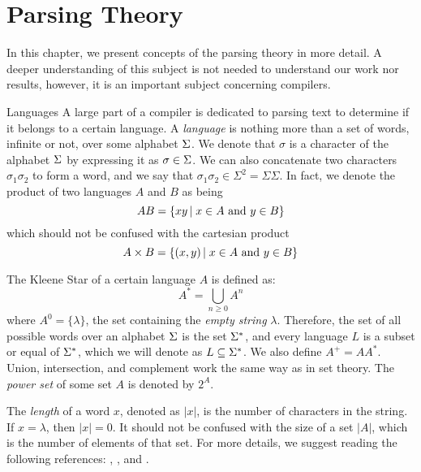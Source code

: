 \chapter{Parsing Theory}\label{sec:apendix-parser}

In this chapter, we present concepts of the parsing theory in more detail. A
deeper understanding of this subject is not needed to understand our work nor
results, however, it is an important subject concerning compilers.

\begin{section}{Languages}
A large part of a compiler is dedicated to parsing text to determine if
it belongs to a certain language. A \textit{language} is nothing more than
a set of words, infinite or not, over some alphabet $\Sigma$. We denote that
$\sigma$ is a character of the alphabet $\Sigma$ by expressing it as
$\sigma \in \Sigma$. We can also concatenate two characters $\sigma_1 \sigma_2$
to form a word, and we say that $\sigma_1 \sigma_2 \in \Sigma^2 = \Sigma\Sigma$.
In fact, we denote the product of two languages $A$ and $B$ as being
$$AB = \{xy\,|\;x \in A \text{ and } y \in B\}$$
which should not be confused with the cartesian product
$$A \times B = \{(x, y)\,|\;x \in A \text{ and } y \in B\}$$

The Kleene Star of a certain language $A$ is defined as:
$$A^* = \bigcup_{n \geq 0} A^n$$
where $A^0 = \{\lambda\}$, the set containing the \textit{empty string} $\lambda$.
Therefore, the set of all possible words over an alphabet $\Sigma$ is the set
$\Sigma^*$, and every language $L$ is a subset or equal of $\Sigma^*$, which we will
denote as $L \subseteq \Sigma^*$. We also define $A^+ = AA^*$. Union, intersection,
and complement work the same way as in set theory. The \textit{power set}
of some set $A$ is denoted by $2^A$.

The \textit{length} of a word $x$, denoted as $|x|$, is the number of characters
in the string. If $x = \lambda$, then $|x| = 0$. It should not be confused with
the size of a set $|A|$, which is the number of elements of that set.
For more details, we suggest reading the following references: \cite{sipser2012},
\cite{lewis1998elements}, and \cite{hopcroft2001introduction}.
\end{section}

